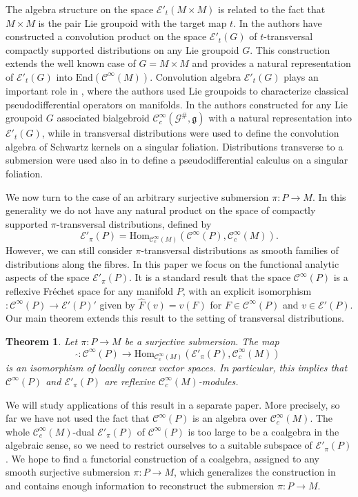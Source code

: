 \documentclass[a4paper]{amsart}
\newtheorem*{theorem}{Theorem}
\newcommand{\cE}{\mathcal{E}}
\newcommand{\Hom}{\text{Hom}}
\newcommand{\End}{\text{End}}
\newcommand{\fg}{\mathfrak{g}}
\newcommand{\C}{\mathord{\mathcal{C}^{\infty}}}
\newcommand{\Cc}{\mathord{\mathcal{C}^{\infty}_{c}}}
\newcommand{\GGG}{\mathscr{G}^{\scriptscriptstyle\#}}
\begin{document}
The algebra structure on the space $\cE'_{t}(M\times M)$ is related to the fact that $M\times M$ is the pair Lie groupoid 
with the target map $t$. In \cite{LeMaVa17} the authors have constructed a convolution product on the space $\cE'_{t}(G)$ of
$t$-transversal compactly supported distributions on any Lie groupoid $G$. This construction extends the well known case of $G=M\times M$ and
provides a natural representation of $\cE'_{t}(G)$ into $\End(\C(M))$. Convolution algebra $\cE'_{t}(G)$ 
plays an important role in \cite{ErYu19}, where the authors used Lie groupoids to characterize classical pseudodifferential operators on manifolds.
In \cite{KaMr22} the authors constructed for any Lie groupoid $G$ associated bialgebroid $\Cc(\GGG,\fg)$ with a natural representation into
$\cE'_{t}(G)$, while in \cite{AnMoYu21} transversal distributions were used to
define the convolution algebra of Schwartz kernels on a singular foliation. Distributions transverse to a submersion were used also 
in \cite{AnSk11} to define a pseudodifferential calculus on a singular foliation.

We now turn to the case of an arbitrary surjective submersion $\pi:P\to M$. In this generality we do not have any natural product
on the space of compactly supported $\pi$-transversal distributions, defined by
\[
\cE'_{\pi}(P)=\Hom_{\Cc(M)}(\C(P),\Cc(M)).
\]
However, we can still consider $\pi$-transversal distributions as smooth families of distributions
along the fibres. In this paper we focus on the functional analytic aspects of the space $\cE'_{\pi}(P)$.
It is a standard result that the space $\C(P)$ is a reflexive Fr\'{e}chet space for any manifold $P$, with an explicit isomorphism 
$\hat{}:\C(P)\to\cE'(P)'$ given by $\hat{F}(v)=v(F)$ for $F\in\C(P)$ and $v\in\cE'(P)$.
Our main theorem extends this result to the setting of transversal distributions. 

\begin{theorem}
Let $\pi:P\to M$ be a surjective submersion. The map
\[
\hat{}:\C(P)\to\Hom_{\Cc(M)}(\cE'_{\pi}(P),\Cc(M))
\]
is an isomorphism of locally convex vector spaces. In particular, this implies that $\C(P)$ and $\cE'_{\pi}(P)$
are reflexive $\Cc(M)$-modules.
\end{theorem}

We will study applications of this result in a separate paper. More precisely, so far we have not used the fact that $\C(P)$ is an algebra
over $\Cc(M)$. The whole $\Cc(M)$-dual $\cE'_{\pi}(P)$ of $\C(P)$ is too large to be a coalgebra in the algebraic sense, so we need to
restrict ourselves to a suitable subspace of $\cE'_{\pi}(P)$. We hope to find a functorial construction of a coalgebra, assigned to any
smooth surjective submersion $\pi:P\to M$, which generalizes the construction in \cite{Mrc07} and contains enough information to reconstruct
the submersion $\pi:P\to M$.
\end{document}
